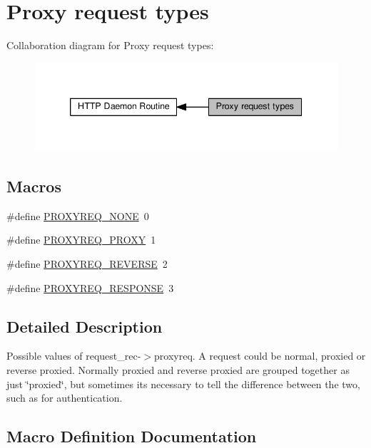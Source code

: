\hypertarget{group__ProxyReq}{}\section{Proxy request types}
\label{group__ProxyReq}
Collaboration diagram for Proxy request types\+:
\nopagebreak
\begin{figure}[H]
\begin{center}
\leavevmode
\includegraphics[width=339pt]{group__ProxyReq}
\end{center}
\end{figure}
\subsection*{Macros}
\begin{DoxyCompactItemize}
\item 
\#define \hyperlink{group__ProxyReq_ga7fa0b3313f7e51f2dac785e0b0772c32}{P\+R\+O\+X\+Y\+R\+E\+Q\+\_\+\+N\+O\+NE}~0
\item 
\#define \hyperlink{group__ProxyReq_gaa879e84f9b9d334007ef4c542bf6374e}{P\+R\+O\+X\+Y\+R\+E\+Q\+\_\+\+P\+R\+O\+XY}~1
\item 
\#define \hyperlink{group__ProxyReq_gada87167650249c33339a5992ad199219}{P\+R\+O\+X\+Y\+R\+E\+Q\+\_\+\+R\+E\+V\+E\+R\+SE}~2
\item 
\#define \hyperlink{group__ProxyReq_gaedfe04be933e20251ce580aa6b15d864}{P\+R\+O\+X\+Y\+R\+E\+Q\+\_\+\+R\+E\+S\+P\+O\+N\+SE}~3
\end{DoxyCompactItemize}


\subsection{Detailed Description}
Possible values of request\+\_\+rec-\/$>$proxyreq. A request could be normal, proxied or reverse proxied. Normally proxied and reverse proxied are grouped together as just \char`\"{}proxied\char`\"{}, but sometimes it\textquotesingle{}s necessary to tell the difference between the two, such as for authentication. 

\subsection{Macro Definition Documentation}
